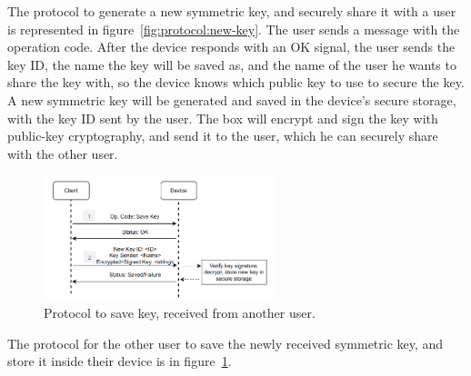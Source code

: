 The protocol to generate a new symmetric key, and securely share it with a user is represented in figure~\ref{fig:protocol:new-key}.
The user sends a message with the operation code.
After the device responds with an OK signal, the user sends the key ID, the name the key will be saved as, and the name of the user he wants to share the key with, so the device knows which public key to use to secure the key.
A new symmetric key will be generated and saved in the device's secure storage, with the key ID sent by the user. The box will encrypt and sign the key with public-key cryptography, and send it to the user, which he can securely share with the other user.

\begin{figure}[h]
	\centering
	\includegraphics[width=0.6\textwidth]{./Images/save-key.png}
	\caption{Protocol to save key, received from another user.}
	\label{fig:protocol:save-key}
\end{figure}

The protocol for the other user to save the newly received symmetric key, and store it inside their device is in figure~\ref{fig:protocol:save-key}.

